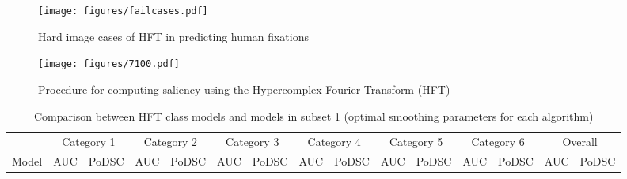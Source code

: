 \documentclass[10pt,journal,cspaper,compsoc]{IEEEtran}
\begin{document}
\begin{figure}
\begin{center}
\texttt{[image: figures/failcases.pdf]}
\end{center}
   \caption{Hard image cases of HFT in predicting human fixations}
\label{failcases}
\end{figure}

\begin{figure*}
\begin{center}
\texttt{[image: figures/7100.pdf]}
\end{center}
   \caption{Procedure for computing  saliency  using the Hypercomplex Fourier Transform (HFT)}
\label{fig:Exp71}
\end{figure*}


\begin{table*}[htbp] 	
\caption{Comparison between HFT class models and models in subset 1 (optimal smoothing parameters for each algorithm)} 	
\label{Smooth}
\centering 	
\begin{tabular}{@{}lp{.78cm}p{.78cm}p{.78cm}p{.78cm}p{.78cm}p{.78cm}p{.78cm}p{.78cm}p{.78cm}p{.78cm}p{.78cm}p{.78cm}p{.78cm}p{.78cm}@{}}
\toprule
&\multicolumn{2}{c}{Category 1}
&\multicolumn{2}{c}{Category 2}
&\multicolumn{2}{c}{Category 3}
&\multicolumn{2}{c}{Category 4}
&\multicolumn{2}{c}{Category 5}
&\multicolumn{2}{c}{Category 6}
&\multicolumn{2}{c}{Overall}\\
\cmidrule(lr){2-3} \cmidrule(lr){4-5} \cmidrule(lr){6-7} \cmidrule(lr){8-9} \cmidrule(lr){10-11} \cmidrule(lr){12-13} \cmidrule(lr){14-15}
Model & \scriptsize{AUC} & \scriptsize{PoDSC}
& \scriptsize{AUC} & \scriptsize{PoDSC}
& \scriptsize{AUC} & \scriptsize{PoDSC}
& \scriptsize{AUC} & \scriptsize{PoDSC}
& \scriptsize{AUC} & \scriptsize{PoDSC}
& \scriptsize{AUC} & \scriptsize{PoDSC}
& \scriptsize{AUC} & \scriptsize{PoDSC}\\
\midrule 	



\end{tabular}
\end{table*}
\end{document}
